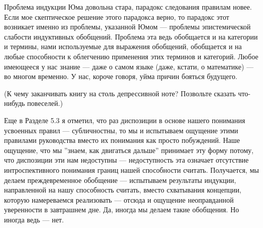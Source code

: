 \documentclass[11pt]{book}
\begin{document}
Проблема индукции Юма довольна стара, парадокс следования правилам новее. Если мое скептическое решение этого парадокса верно, то парадокс этот возникает именно из проблемы, указанной Юмом --- проблемы эпистемической слабости индуктивных обобщений. Проблема эта ведь обобщается и на категории и термины, нами используемые для выражения обобщений, обобщается и на любые способности к облегчению применения этих терминов и категорий. Любое имеющееся у нас знание --- даже о самом языке (даже, кстати, о математике) --- во многом временно. У нас, короче говоря, уйма причин бояться будущего.

(К чему заканчивать книгу на столь депрессивной ноте? Позвольте сказать что-нибудь повеселей.)

Еще в Разделе 5.3 я отметил, что раз диспозиции в основе нашего понимания усвоенных правил --- субличностны, то мы и испытываем ощущение этими правилами руководства вместо их понимания как просто побуждений. Наше ощущение, что мы ''знаем, как двигаться дальше'' принимает эту форму потому, что диспозиции эти нам недоступны --- недоступность эта означает отсутствие интроспективного понимания границ нашей способности считать. Получается, мы делаем преждевременное обобщение --- испытываем результаты индукции, направленной на нашу способность считать, вместо схватывания концепции, которую намереваемся реализовать --- отсюда и ощущение неоправданной уверенности в завтрашнем дне. Да, иногда мы делаем такие обобщения. Но иногда ведь --- нет.
\end{document}
